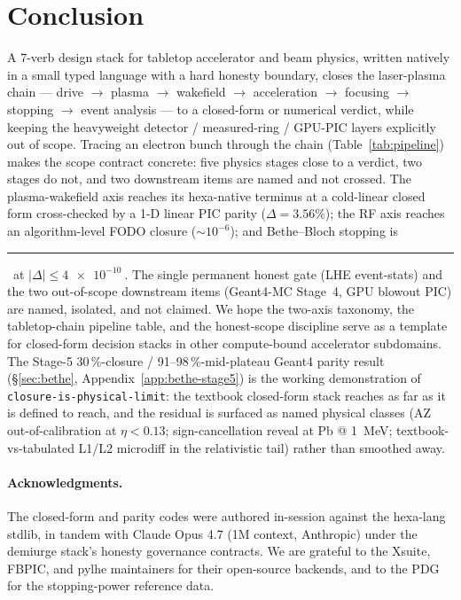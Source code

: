 \documentclass[11pt,a4paper]{article}
\newcommand{\tierdisc}[1]{\textcolor{#1}{\rule[0.05ex]{1.0ex}{1.0ex}}}
\newcommand{\tierGreen}{\tierdisc{green!60!black}}
\begin{document}
\section{Conclusion}
\label{sec:conclusion}

A 7-verb design stack for tabletop accelerator and beam physics, written
natively in a small typed language with a hard honesty boundary, closes
the laser-plasma chain --- drive $\to$ plasma $\to$ wakefield $\to$
acceleration $\to$ focusing $\to$ stopping $\to$ event analysis --- to a
closed-form or numerical verdict, while keeping the heavyweight
detector / measured-ring / GPU-PIC layers explicitly out of scope.
Tracing an electron bunch through the chain (Table~\ref{tab:pipeline})
makes the scope contract concrete: five physics stages close to a
verdict, two stages do not, and two downstream items are named and not
crossed. The plasma-wakefield axis reaches its hexa-native terminus at a
cold-linear closed form cross-checked by a 1-D linear PIC parity
($\Delta=3.56\%$); the RF axis reaches an algorithm-level FODO closure
($\sim\!10^{-6}$); and Bethe--Bloch stopping is \tierGreen\ at
$|\Delta|\!\le\!\SI{4e-10}{}$. The single permanent honest gate (LHE
event-stats) and the two out-of-scope downstream items (Geant4-MC
Stage~4, GPU blowout PIC) are named, isolated, and not claimed. We hope
the two-axis taxonomy, the tabletop-chain pipeline table, and the
honest-scope discipline serve as a template for closed-form decision
stacks in other compute-bound accelerator subdomains. The Stage-5
30\,\%-closure / 91--98\,\%-mid-plateau Geant4 parity result
(\S\ref{sec:bethe}, Appendix~\ref{app:bethe-stage5}) is the working
demonstration of \texttt{closure-is-physical-limit}: the textbook
closed-form stack reaches as far as it is defined to reach, and the
residual is surfaced as named physical classes (AZ out-of-calibration at
$\eta\!<\!0.13$; sign-cancellation reveal at Pb @ \SI{1}{MeV};
textbook-vs-tabulated L1/L2 microdiff in the relativistic tail) rather
than smoothed away.

\paragraph{Acknowledgments.} The closed-form and parity codes were
authored in-session against the hexa-lang stdlib, in tandem with
Claude Opus 4.7 (1M context, Anthropic) under the demiurge stack's
honesty governance contracts. We are grateful to the Xsuite, FBPIC, and
pylhe maintainers for their open-source backends, and to the PDG for the
stopping-power reference data.
\end{document}
